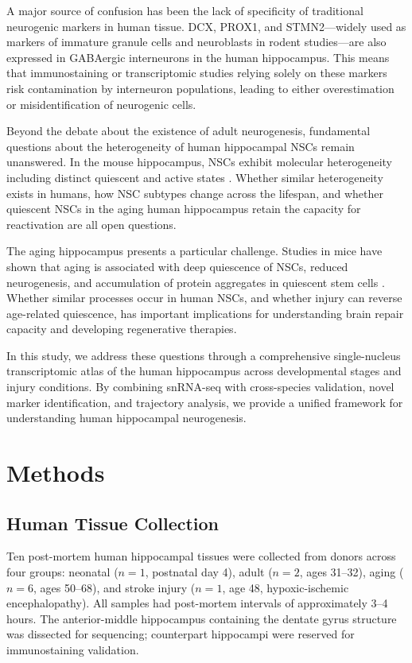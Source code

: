 \documentclass[11pt]{article}
\begin{document}
A major source of confusion has been the lack of specificity of traditional neurogenic markers in human tissue. DCX, PROX1, and STMN2---widely used as markers of immature granule cells and neuroblasts in rodent studies---are also expressed in GABAergic interneurons in the human hippocampus. This means that immunostaining or transcriptomic studies relying solely on these markers risk contamination by interneuron populations, leading to either overestimation or misidentification of neurogenic cells.

Beyond the debate about the existence of adult neurogenesis, fundamental questions about the heterogeneity of human hippocampal NSCs remain unanswered. In the mouse hippocampus, NSCs exhibit molecular heterogeneity including distinct quiescent and active states \citep{hochgerner2018conserved, bond2015adult}. Whether similar heterogeneity exists in humans, how NSC subtypes change across the lifespan, and whether quiescent NSCs in the aging human hippocampus retain the capacity for reactivation are all open questions.

The aging hippocampus presents a particular challenge. Studies in mice have shown that aging is associated with deep quiescence of NSCs, reduced neurogenesis, and accumulation of protein aggregates in quiescent stem cells \citep{leeman2018lysosome}. Whether similar processes occur in human NSCs, and whether injury can reverse age-related quiescence, has important implications for understanding brain repair capacity and developing regenerative therapies.

In this study, we address these questions through a comprehensive single-nucleus transcriptomic atlas of the human hippocampus across developmental stages and injury conditions. By combining snRNA-seq with cross-species validation, novel marker identification, and trajectory analysis, we provide a unified framework for understanding human hippocampal neurogenesis.

\section{Methods}

\subsection{Human Tissue Collection}

Ten post-mortem human hippocampal tissues were collected from donors across four groups: neonatal ($n = 1$, postnatal day 4), adult ($n = 2$, ages 31--32), aging ($n = 6$, ages 50--68), and stroke injury ($n = 1$, age 48, hypoxic-ischemic encephalopathy). All samples had post-mortem intervals of approximately 3--4 hours. The anterior-middle hippocampus containing the dentate gyrus structure was dissected for sequencing; counterpart hippocampi were reserved for immunostaining validation.
\end{document}
